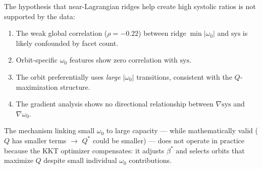 The hypothesis that near-Lagrangian ridges help create high systolic
ratios is not supported by the data:
\begin{enumerate}
\item The weak global correlation ($\rho = -0.22$) between
  $\mathrm{ridge}\;\min|\omega_0|$ and $\mathrm{sys}$ is likely
  confounded by facet count.
\item Orbit-specific $\omega_0$ features show zero correlation with
  $\mathrm{sys}$.
\item The orbit preferentially uses \emph{large} $|\omega_0|$
  transitions, consistent with the $Q$-maximization structure.
\item The gradient analysis shows no directional relationship between
  $\nabla\mathrm{sys}$ and $\nabla\omega_0$.
\end{enumerate}

The mechanism linking small $\omega_0$ to large capacity --- while
mathematically valid ($Q$ has smaller terms $\to$ $Q^*$ could be
smaller) --- does not operate in practice because the KKT optimizer
compensates: it adjusts $\beta^*$ and selects orbits that maximize $Q$
despite small individual $\omega_0$ contributions.
